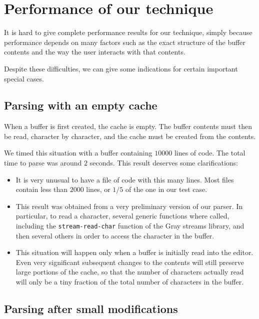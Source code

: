 \section{Performance of our technique}

It is hard to give complete performance results for our technique,
simply because performance depends on many factors such as the exact
structure of the buffer contents and the way the user interacts with
that contents.

Despite these difficulties, we can give some indications for certain
important special cases.

\subsection{Parsing with an empty cache}

When a buffer is first created, the cache is empty.  The buffer
contents must then be read, character by character, and the cache must
be created from the contents.

We timed this situation with a buffer containing $10000$ lines of
\commonlisp{} code.  The total time to parse was around $2$ seconds.
This result deserves some clarifications:

\begin{itemize}
\item It is very unusual to have a file of \commonlisp{} code with
  this many lines.  Most files contain less than $2000$ lines, or
  $1/5$ of the one in our test case.
\item This result was obtained from a very preliminary version of our
  parser.  In particular, to read a character, several generic
  functions where called, including the \texttt{stream-read-char}
  function of the Gray streams library, and then several others in
  order to access the character in the buffer.
\item This situation will happen only when a buffer is initially read
  into the editor.  Even very significant subsequent changes to the
  contents will still preserve large portions of the cache, so that
  the number of characters actually read will only be a tiny fraction
  of the total number of characters in the buffer.
\end{itemize}

\subsection{Parsing after small modifications}

